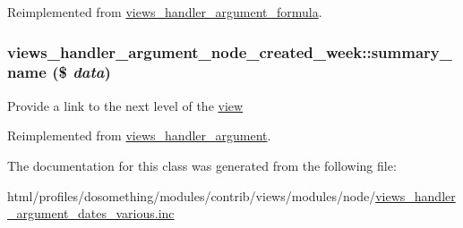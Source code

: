 Reimplemented from \hyperlink{classviews__handler__argument__formula_a01284402427de2bcfa1b1da5792a2332}{views\_\-handler\_\-argument\_\-formula}.\hypertarget{classviews__handler__argument__node__created__week_a12d7be7da978ed5571bb28a17b6b2805}{
\subsubsection[{summary\_\-name}]{\setlength{\rightskip}{0pt plus 5cm}views\_\-handler\_\-argument\_\-node\_\-created\_\-week::summary\_\-name (\$ {\em data})}}
\label{classviews__handler__argument__node__created__week_a12d7be7da978ed5571bb28a17b6b2805}
Provide a link to the next level of the \hyperlink{classview}{view} 

Reimplemented from \hyperlink{classviews__handler__argument_a4c55a340453eed4d35c69f7ac790cac1}{views\_\-handler\_\-argument}.

The documentation for this class was generated from the following file:\begin{DoxyCompactItemize}
\item 
html/profiles/dosomething/modules/contrib/views/modules/node/\hyperlink{views__handler__argument__dates__various_8inc}{views\_\-handler\_\-argument\_\-dates\_\-various.inc}\end{DoxyCompactItemize}
